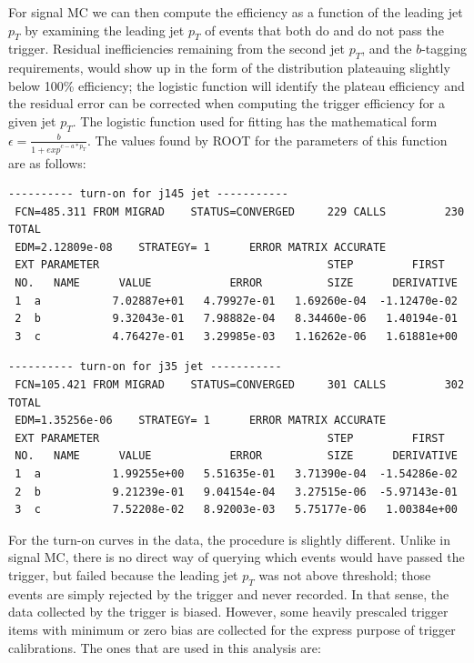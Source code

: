 For signal MC we can then compute the efficiency as a function of the leading jet $p_T$ by
examining the leading jet $p_T$ of events that both do and do not pass the trigger.
Residual inefficiencies remaining from the second jet $p_T$, and the $b$-tagging requirements,
would show up in the form of the distribution plateauing slightly below 100\% efficiency;
the logistic function will identify the plateau efficiency and the residual error can be corrected when
computing the trigger efficiency for a given jet $p_T$.  The logistic function used for 
fitting has the mathematical form $\epsilon = \frac{b}{1+exp^{c-a*p_T}}$.  The values found
by ROOT for the parameters of this function are as follows:

\scriptsize
\begin{verbatim}
---------- turn-on for j145 jet -----------
 FCN=485.311 FROM MIGRAD    STATUS=CONVERGED     229 CALLS         230 TOTAL
 EDM=2.12809e-08    STRATEGY= 1      ERROR MATRIX ACCURATE 
 EXT PARAMETER                                   STEP         FIRST   
 NO.   NAME      VALUE            ERROR          SIZE      DERIVATIVE 
 1  a           7.02887e+01   4.79927e-01   1.69260e-04  -1.12470e-02
 2  b           9.32043e-01   7.98882e-04   8.34460e-06   1.40194e-01
 3  c           4.76427e-01   3.29985e-03   1.16262e-06   1.61881e+00
\end{verbatim}

\scriptsize
\begin{verbatim}
---------- turn-on for j35 jet -----------
 FCN=105.421 FROM MIGRAD    STATUS=CONVERGED     301 CALLS         302 TOTAL
 EDM=1.35256e-06    STRATEGY= 1      ERROR MATRIX ACCURATE 
 EXT PARAMETER                                   STEP         FIRST   
 NO.   NAME      VALUE            ERROR          SIZE      DERIVATIVE 
 1  a           1.99255e+00   5.51635e-01   3.71390e-04  -1.54286e-02
 2  b           9.21239e-01   9.04154e-04   3.27515e-06  -5.97143e-01
 3  c           7.52208e-02   8.92003e-03   5.75177e-06   1.00384e+00
\end{verbatim}

\normalsize

For the turn-on curves in the data, the procedure is slightly different.  Unlike in signal
MC, there is no direct way of querying which events would have passed the trigger, but failed
because the leading jet $p_T$ was not above threshold; those events are simply rejected by 
the trigger and never recorded.  In that sense, the data collected by the trigger is biased.
However, some heavily prescaled trigger items with minimum or zero bias are collected for 
the express purpose of trigger calibrations.  The ones that are used in this analysis are:

